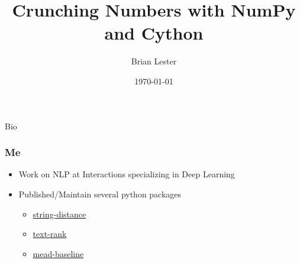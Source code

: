 \documentclass{beamer}
\title{Crunching Numbers with NumPy and Cython}
\author{Brian Lester}
\institute{interactions}
\date{\today}
\theoremstyle{case}
\begin{document}
\def\R{\mathbb{R}}
\frame{\titlepage}

\begin{section}{Bio}

\begin{frame}
    \frametitle{Me}
    \begin{itemize}
        \item Work on NLP at Interactions specializing in Deep Learning
        \item Published/Maintain several python packages
        \begin{itemize}
            \item \href{https://github.com/blester125/string-distance}{string-distance}
            \item \href{https://github.com/blester125/text-rank}{text-rank}
            \item \href{https://github.com/dpressel/mead-baseline}{mead-baseline}
        \end{itemize}
    \end{itemize}
\end{frame}

\end{section} %
\end{document}
